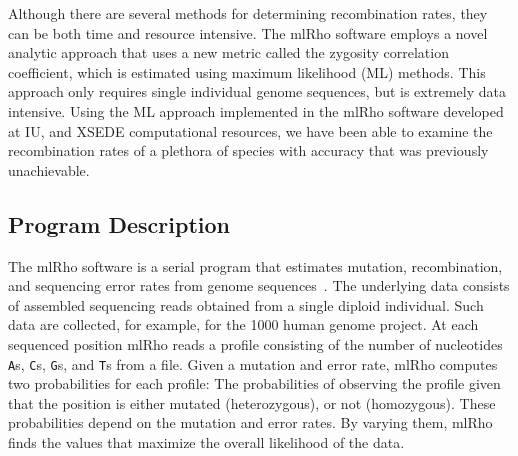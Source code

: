 \documentclass{sig-alternate}
\begin{document}
Although there are several methods for determining recombination rates, they can be both time and resource intensive. The mlRho software employs a novel analytic approach that uses a new metric called the zygosity correlation coefficient, which is estimated using maximum likelihood (ML) methods. This approach only requires single individual genome sequences, but is extremely data intensive. Using the ML approach implemented in the mlRho software developed at IU, and XSEDE computational resources, we have been able to examine the recombination rates of a plethora of species with accuracy that was previously unachievable. 

%

\subsection{Program Description}
The mlRho software is a serial program that estimates mutation, recombination, and sequencing error rates from
genome sequences~\cite{MEC:MEC4482}. The underlying data consists of assembled sequencing reads obtained from
a single diploid individual. Such data are collected, for example, for the 1000 human genome project. At each
sequenced position mlRho reads a profile consisting of the number of nucleotides \texttt{A}s, \texttt{C}s, \texttt{G}s, and \texttt{T}s from a file. 
   Given a mutation and error rate, mlRho computes two probabilities for each profile: The
probabilities of observing the profile given that the position is either mutated (heterozygous), or not
(homozygous). These probabilities depend on the mutation and error rates. By varying them, mlRho finds the
values that maximize the overall likelihood of the data.
\end{document}
